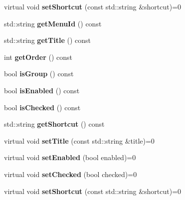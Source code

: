 \begin{DoxyCompactItemize}
\mbox{\label{classPlayerMenuItem_ae49c2860f10ca123daf0ec0a2949ca54}} 
virtual void {\bfseries set\+Shortcut} (const std\+::string \&shortcut)=0
\item 
\mbox{\label{classPlayerMenuItem_a141817b9b1e8391cffccd6ae5fa9c483}} 
std\+::string {\bfseries get\+Menu\+Id} () const
\item 
\mbox{\label{classPlayerMenuItem_a0c7fab72ed8298958b62c47c3e0608a5}} 
std\+::string {\bfseries get\+Title} () const
\item 
\mbox{\label{classPlayerMenuItem_a19c976698711e1ad7b6063852f3c00c9}} 
int {\bfseries get\+Order} () const
\item 
\mbox{\label{classPlayerMenuItem_a06a19e2051bcc39a52876377af4eb99a}} 
bool {\bfseries is\+Group} () const
\item 
\mbox{\label{classPlayerMenuItem_a05725bc23b5b8f881ec79eedaaca8328}} 
bool {\bfseries is\+Enabled} () const
\item 
\mbox{\label{classPlayerMenuItem_ad6e8d2ebd0edac2feefbe704fac776ba}} 
bool {\bfseries is\+Checked} () const
\item 
\mbox{\label{classPlayerMenuItem_a66487fa15cad99a96911cba5078ec052}} 
std\+::string {\bfseries get\+Shortcut} () const
\item 
\mbox{\label{classPlayerMenuItem_ab6ea2d1abec88751d164f746712a49ed}} 
virtual void {\bfseries set\+Title} (const std\+::string \&title)=0
\item 
\mbox{\label{classPlayerMenuItem_a989104eb681f77541fb7136a8ad12368}} 
virtual void {\bfseries set\+Enabled} (bool enabled)=0
\item 
\mbox{\label{classPlayerMenuItem_a75e9dde4aa28cdec7fe2524246ec7ec5}} 
virtual void {\bfseries set\+Checked} (bool checked)=0
\item 
\mbox{\label{classPlayerMenuItem_ae49c2860f10ca123daf0ec0a2949ca54}} 
virtual void {\bfseries set\+Shortcut} (const std\+::string \&shortcut)=0
\end{DoxyCompactItemize}
